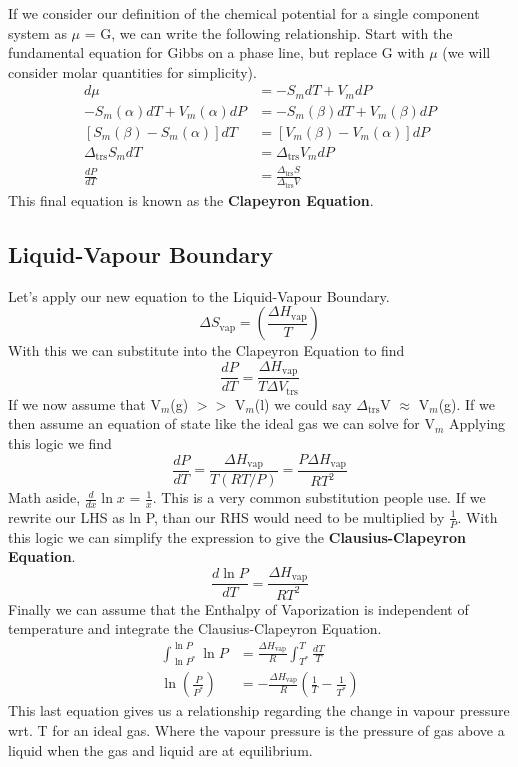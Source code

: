 \documentclass{article}
\newcommand{\be}{\begin{equation}}
\newcommand{\ee}{\end{equation}}
\begin{document}
If we consider our definition of the chemical potential for a single component system as $\mu$ = G, we can write the following relationship. 
Start with the fundamental equation for Gibbs on a phase line, but replace G with $\mu$ (we will consider molar quantities for simplicity). 
\be
\begin{split}
d\mu &= -S_mdT + V_mdP\\
-S_m(\alpha)dT + V_m(\alpha)dP &= -S_m(\beta)dT + V_m(\beta)dP\\
\left[ S_m(\beta) - S_m(\alpha) \right]dT &= \left[ V_m(\beta) - V_m(\alpha) \right]dP \\
\Delta_{\text{trs}}S_mdT  &=  \Delta_{\text{trs}}V_mdP \\
\frac{dP}{dT} &= \frac{\Delta_{\text{trs}} S}{\Delta_{\text{trs}} V}
\end{split}
\ee
This final equation is known as the \textbf{Clapeyron Equation}.

\subsection*{Liquid-Vapour Boundary}
Let's apply our new equation to the Liquid-Vapour Boundary. 
\be
\Delta S_{\text{vap}} = \left( \frac{\Delta H_{\text{vap}}}{T} \right)
\ee
With this we can substitute into the Clapeyron Equation to find
\be
\frac{dP}{dT} = \frac{\Delta H_{\text{vap}}}{T\Delta V_{\text{trs}}}
\ee
If we now assume that V$_m$(g) $>>$ V$_m$(l) we could say $\Delta_{\text{trs}}$V $\approx$ V$_m$(g). 
If we then assume an equation of state like the ideal gas we can solve for V$_m$
Applying this logic we find
\be
\frac{dP}{dT} = \frac{\Delta H_{\text{vap}}}{T(RT/P)} =\frac{P\Delta H_{\text{vap}}}{RT^2}
\ee
Math aside, $\frac{d}{dx} \ln x$ = $\frac{1}{x}$. This is a very common substitution people use. 
If we rewrite our LHS as ln P, than our RHS would need to be multiplied by $\frac{1}{P}$. 
With this logic we can simplify the expression to give the \textbf{Clausius-Clapeyron Equation}.
\be
\frac{d\ln P}{dT} = \frac{\Delta H_{\text{vap}}}{RT^2}
\ee
Finally we can assume that the Enthalpy of Vaporization is independent of temperature and integrate the Clausius-Clapeyron Equation.
\be
\begin{split}
\int_{\ln P^*}^{\ln P} \ln P &= \frac{\Delta H_{\text{vap}}}{R} \int_{T^*}^T \frac{dT}{T}\\
\ln \left( \frac{P}{P^*} \right) &=  -\frac{\Delta H_{\text{vap}}}{R} \left( \frac{1}{T} - \frac{1}{T^*} \right)
\end{split}
\ee
This last equation gives us a relationship regarding the change in vapour pressure wrt. T for an ideal gas. 
Where the vapour pressure is the pressure of gas above a liquid when the gas and liquid are at equilibrium. 
\end{document}
